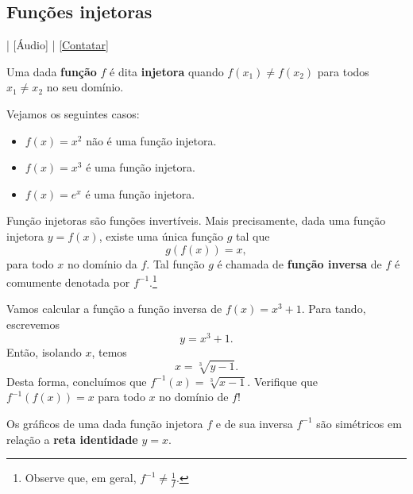 \subsection{Funções injetoras}

\begin{flushright}
  [Vídeo] | [Áudio] | \href{https://phkonzen.github.io/notas/contato.html}{[Contatar]}
\end{flushright}

Uma dada {\bf função} $f$ é dita {\bf injetora} quando $f(x_1)\neq f(x_2)$ para todos $x_1\neq x_2$ no seu domínio.

\begin{ex}
  Vejamos os seguintes casos:
  \begin{itemize}
  \item $f(x) = x^2$ não é uma função injetora.
  \item $f(x) = x^3$ é uma função injetora.
  \item $f(x) = e^x$ é uma função injetora.
  \end{itemize}
\end{ex}

Função injetoras são funções invertíveis. Mais precisamente, dada uma função injetora $y = f(x)$, existe uma única função $g$ tal que
\begin{equation}
  g(f(x)) = x,
\end{equation}
para todo $x$ no domínio da $f$. Tal função $g$ é chamada de {\bf função inversa} de $f$ é comumente denotada por $f^{-1}$.\footnote{Observe que, em geral, $f^{-1} \neq \frac{1}{f}$.}

\begin{ex}
  Vamos calcular a função a função inversa de $f(x) = x^3 + 1$. Para tando, escrevemos
  \begin{equation}
    y = x^3 + 1.
  \end{equation}
  Então, isolando $x$, temos
  \begin{equation}
    x = \sqrt[3]{y - 1}.
  \end{equation}
  Desta forma, concluímos que $f^{-1}(x) = \sqrt[3]{x-1}$. Verifique que $f^{-1}(f(x)) = x$ para todo $x$ no domínio de $f$!
\end{ex}

\begin{obs}
 Os gráficos de uma dada função injetora $f$ e de sua inversa $f^{-1}$ são simétricos em relação a {\bf reta identidade} $y=x$.
\end{obs}

